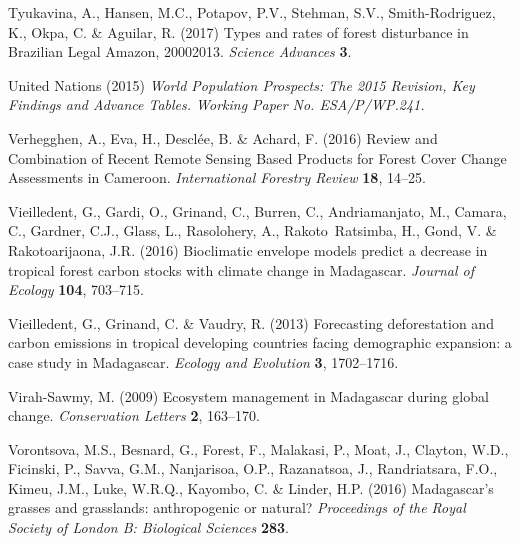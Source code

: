 \documentclass[a4paper, 12pt, leqno]{article}\usepackage[]{graphicx}\usepackage[]{color}
\begin{document}
\begin{thebibliography}{60}
Tyukavina, A., Hansen, M.C., Potapov, P.V., Stehman, S.V., Smith-Rodriguez, K.,
  Okpa, C. \& Aguilar, R. (2017) {Types and rates of forest disturbance in
  Brazilian Legal Amazon, 2000{\textendash}2013}. \emph{Science Advances}
  \textbf{3}.

{United Nations} (2015) \emph{{World Population Prospects: The 2015 Revision,
  Key Findings and Advance Tables. Working Paper No. ESA/P/WP.241.}}

Verhegghen, A., Eva, H., Desclée, B. \& Achard, F. (2016) {Review and
  Combination of Recent Remote Sensing Based Products for Forest Cover Change
  Assessments in Cameroon}. \emph{International Forestry Review} \textbf{18},
  14--25.

Vieilledent, G., Gardi, O., Grinand, C., Burren, C., Andriamanjato, M., Camara,
  C., Gardner, C.J., Glass, L., Rasolohery, A., Rakoto~Ratsimba, H., Gond, V.
  \& Rakotoarijaona, J.R. (2016) {Bioclimatic envelope models predict a
  decrease in tropical forest carbon stocks with climate change in Madagascar}.
  \emph{Journal of Ecology} \textbf{104}, 703--715.

Vieilledent, G., Grinand, C. \& Vaudry, R. (2013) {Forecasting deforestation
  and carbon emissions in tropical developing countries facing demographic
  expansion: a case study in Madagascar}. \emph{Ecology and Evolution}
  \textbf{3}, 1702--1716.

Virah-Sawmy, M. (2009) {Ecosystem management in Madagascar during global
  change}. \emph{Conservation Letters} \textbf{2}, 163--170.

Vorontsova, M.S., Besnard, G., Forest, F., Malakasi, P., Moat, J., Clayton,
  W.D., Ficinski, P., Savva, G.M., Nanjarisoa, O.P., Razanatsoa, J.,
  Randriatsara, F.O., Kimeu, J.M., Luke, W.R.Q., Kayombo, C. \& Linder, H.P.
  (2016) {Madagascar's grasses and grasslands: anthropogenic or natural?}
  \emph{Proceedings of the Royal Society of London B: Biological Sciences}
  \textbf{283}.

\end{thebibliography}
\end{document}
